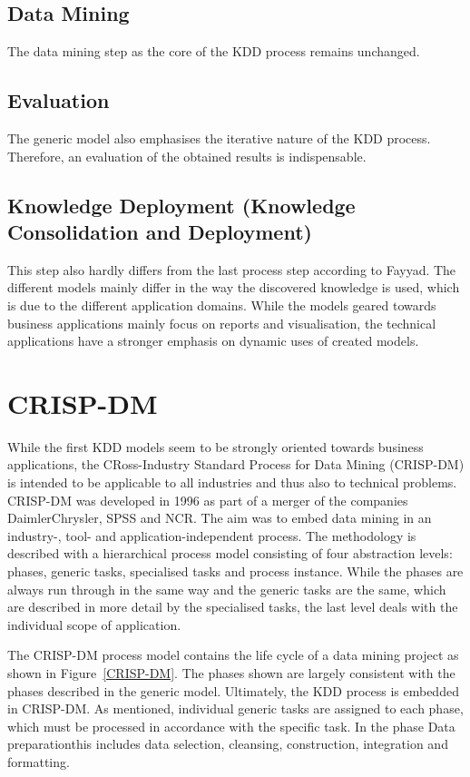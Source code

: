 \subsection{Data Mining}

The data mining step as the core of the KDD process remains unchanged.

\subsection{Evaluation}

The generic model also emphasises the iterative nature of the KDD process. Therefore, an evaluation of the obtained results is indispensable.

\subsection{Knowledge Deployment (Knowledge Consolidation and Deployment)}

This step also hardly differs from the last process step according to Fayyad. The different models mainly differ in the way the discovered knowledge is used, which is due to the different application domains. While the models geared towards business applications mainly focus on reports and visualisation, the technical applications have a stronger emphasis on dynamic uses of created models.


\section{CRISP-DM} \label{CRISP}

While the first KDD models seem to be strongly oriented towards business applications, the CRoss-Industry Standard Process for Data Mining (CRISP-DM) is intended to be applicable to all industries and thus also to technical problems. CRISP-DM was developed in 1996 as part of a merger of the companies DaimlerChrysler, SPSS and NCR. The aim was to embed data mining in an industry-, tool- and application-independent process. The methodology is described with a hierarchical process model consisting of four abstraction levels: phases, generic tasks, specialised tasks and process instance. While the phases are always run through in the same way and the generic tasks are the same, which are described in more detail by the specialised tasks, the last level deals with the individual scope of application. \cite{Chapman:2000}

The CRISP-DM process model contains the life cycle of a data mining project as shown in Figure~\ref{CRISP-DM}. The phases shown are largely consistent with the phases described in the generic model. Ultimately, the KDD process is embedded in CRISP-DM. As mentioned, individual generic tasks are assigned to each phase, which must be processed in accordance with the specific task. In the phase \glqq Data preparation\grqq this includes data selection, cleansing, construction, integration and formatting. \cite{Chapman:2000}


